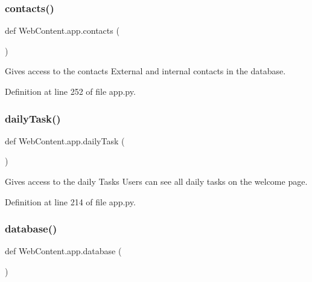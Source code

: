 \mbox{\label{namespace_web_content_1_1app_a243cda6941738022b0168abcbe9d8e7d}} 
\subsubsection{\texorpdfstring{contacts()}{contacts()}}
{\footnotesize\ttfamily def Web\+Content.\+app.\+contacts (\begin{DoxyParamCaption}{ }\end{DoxyParamCaption})}

\begin{DoxyVerb}Gives access to the contacts
External and internal contacts in the database. 
\end{DoxyVerb}
 

Definition at line 252 of file app.\+py.

\mbox{\label{namespace_web_content_1_1app_a9e50daef82abeaa1acba1829fcd2b9ae}} 
\subsubsection{\texorpdfstring{daily\+Task()}{dailyTask()}}
{\footnotesize\ttfamily def Web\+Content.\+app.\+daily\+Task (\begin{DoxyParamCaption}{ }\end{DoxyParamCaption})}

\begin{DoxyVerb}Gives access to the daily Tasks
Users can see all daily tasks on the welcome page. 
\end{DoxyVerb}
 

Definition at line 214 of file app.\+py.

\mbox{\label{namespace_web_content_1_1app_aeb0d3df489a674be05033bd0ba98e7a6}} 
\subsubsection{\texorpdfstring{database()}{database()}}
{\footnotesize\ttfamily def Web\+Content.\+app.\+database (\begin{DoxyParamCaption}{ }\end{DoxyParamCaption})}

